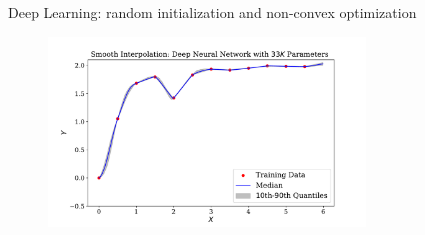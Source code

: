 \documentclass[aspectratio=169,10pt]{beamer}
\begin{document}
\begin{frame}{Deep Learning: random initialization and non-convex optimization  }
	\label{non_convex}
\vspace*{-1mm}

	\begin{figure}[t!]
		\centering
		\includegraphics[width=0.75\textwidth]{figs/smooth_interpolation_100_seeds.pdf}
	\end{figure}
	\hyperlink{dif_dist}{}
\end{frame}
\end{document}
